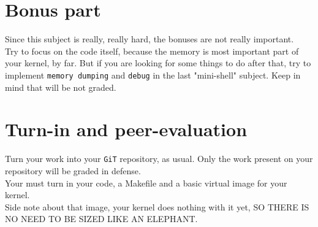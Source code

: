 \documentclass{42-en}
\begin{document}
\newpage
\chapter{Bonus part}

	Since this subject is really, really hard, the bonuses are not really important.\\
	Try to focus on the code itself, because the memory is most important
	part of your kernel, by far. But if you are looking for some things to do
	after that, try to implement \texttt{memory dumping} and \texttt{debug}
	in the last "mini-shell" subject.
	Keep in mind that will be not graded.

\newpage
\chapter{Turn-in and peer-evaluation}

	Turn your work into your \texttt{GiT} repository, as usual.
	Only the work present on your repository will be graded in defense.\\

	Your must turn in your code, a Makefile and a basic virtual image for your kernel.\\
	Side note about that image, your kernel does nothing with it yet,
	SO THERE IS NO NEED TO BE SIZED LIKE AN ELEPHANT.




\end{document}
